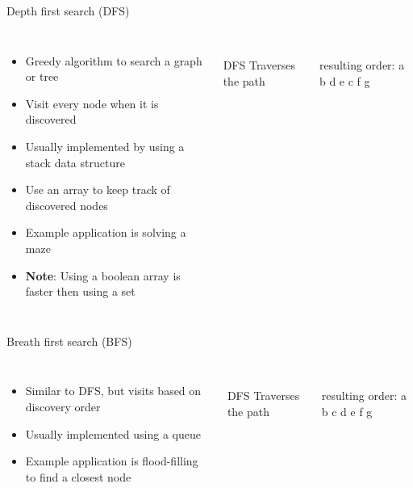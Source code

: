 \documentclass[11pt,pdf, aspectratio=169]{beamer}
\begin{document}
  \begin{frame}{Depth first search (DFS)}
    \begin{columns}
      \begin{itemize}
        \item Greedy algorithm to search a graph or tree
        \item Visit every node when it is discovered
        \item Usually implemented by using a stack data structure
        \item Use an array to keep track of discovered nodes
        \item Example application is solving a maze
        \item \textbf{Note}: Using a boolean array is faster then using a set
      \end{itemize}
      \\
      DFS Traverses the path
      \\
      resulting order: a b d e c f g
    \end{columns}
  \end{frame}
  \begin{frame}{Breath first search (BFS)}
    \begin{columns}
    \begin{itemize}
      \item Similar to DFS, but visits based on discovery order
      \item Usually implemented using a queue
      \item Example application is flood-filling to find a closest node
    \end{itemize}
      \\
      DFS Traverses the path
      \\
      resulting order: a b c d e f g
    \end{columns}
  \end{frame}
\end{document}
